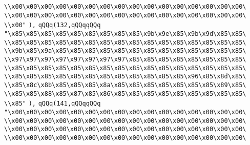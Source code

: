 \verb|\\x00\x00\x00\x00\x00\x00\x00\x00\x00\x00\x00\x00\x00\x00\x00\x00\|\newline
\verb|\\x00\x00\x00\x00\x00\x00\x00\x00\x00\x00\x00\x00\x00\x00\x00\x00\|\newline
\verb|\\x00"|\newline
\verb|),|\newline
\verb|qQQq(132,qQQqqQQq|\newline
\verb|"\x85\x85\x85\x85\x85\x85\x85\x85\x85\x9b\x9e\x85\x9b\x9d\x85\x85\|\newline
\verb|\\x85\x85\x85\x85\x85\x85\x85\x85\x85\x85\x85\x85\x85\x85\x85\x85\|\newline
\verb|\\x9b\x85\x9a\x85\x85\x85\x85\x85\x85\x85\x85\x85\x85\x85\x85\x85\|\newline
\verb|\\x97\x97\x97\x97\x97\x97\x97\x97\x85\x85\x85\x85\x85\x85\x85\x85\|\newline
\verb|\\x85\x85\x85\x85\x85\x85\x85\x85\x85\x85\x85\x85\x85\x85\x85\x85\|\newline
\verb|\\x85\x85\x85\x85\x85\x85\x85\x85\x85\x85\x85\x85\x96\x85\x8d\x85\|\newline
\verb|\\x85\x8c\x8b\x85\x85\x85\x8a\x85\x85\x85\x85\x85\x85\x85\x89\x85\|\newline
\verb|\\x85\x85\x88\x85\x87\x85\x86\x85\x85\x85\x85\x85\x85\x85\x85\x85\|\newline
\verb|\\x85"|\newline
\verb|),|\newline
\verb|qQQq(141,qQQqqQQq|\newline
\verb|"\x00\x00\x00\x00\x00\x00\x00\x00\x00\x00\x00\x00\x00\x00\x00\x00\|\newline
\verb|\\x00\x00\x00\x00\x00\x00\x00\x00\x00\x00\x00\x00\x00\x00\x00\x00\|\newline
\verb|\\x00\x00\x00\x00\x00\x00\x00\x00\x00\x00\x00\x00\x00\x00\x00\x00\|\newline
\verb|\\x00\x00\x00\x00\x00\x00\x00\x00\x00\x00\x00\x00\x00\x00\x00\x00\|\newline
